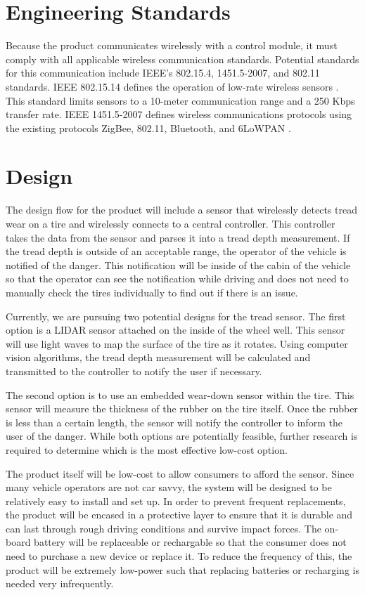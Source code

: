 \documentclass[11pt]{IEEEtran}
\begin{document}
	\section{Engineering Standards}
		Because the product communicates wirelessly with a control module, it must comply with all applicable wireless communication standards. Potential standards for this communication include IEEE’s 802.15.4, 1451.5-2007, and 802.11 standards. IEEE 802.15.14 defines the operation of low-rate wireless sensors \cite{80215standard}. This standard limits sensors to a 10-meter communication range and a 250 Kbps transfer rate. IEEE 1451.5-2007 defines wireless communications protocols using the existing protocols ZigBee, 802.11, Bluetooth, and 6LoWPAN \cite{1451standard}.

	\section{Design}
		The design flow for the product will include a sensor that wirelessly detects tread wear on a tire and wirelessly connects to a central controller. This controller takes the data from the sensor and parses it into a tread depth measurement. If the tread depth is outside of an acceptable range, the operator of the vehicle is notified of the danger. This notification will be inside of the cabin of the vehicle so that the operator can see the notification while driving and does not need to manually check the tires individually to find out if there is an issue. 

		Currently, we are pursuing two potential designs for the tread sensor. The first option is a LIDAR sensor attached on the inside of the wheel well. This sensor will use light waves to map the surface of the tire as it rotates. Using computer vision algorithms, the tread depth measurement will be calculated and transmitted to the controller to notify the user if necessary.

		The second option is to use an embedded wear-down sensor within the tire. This sensor will measure the thickness of the rubber on the tire itself. Once the rubber is less than a certain length, the sensor will notify the controller to inform the user of the danger. While both options are potentially feasible, further research is required to determine which is the most effective low-cost option.

		The product itself will be low-cost to allow consumers to afford the sensor. Since many vehicle operators are not car savvy, the system will be designed to be relatively easy to install and set up. In order to prevent frequent replacements, the product will be encased in a protective layer to ensure that it is durable and can last through rough driving conditions and survive impact forces. The on-board battery will be replaceable or rechargable so that the consumer does not need to purchase a new device or replace it. To reduce the frequency of this, the product will be extremely low-power such that replacing batteries or recharging is needed very infrequently.
\end{document}
